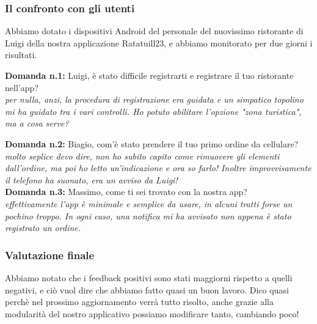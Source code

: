     \subsubsection{Il confronto con gli utenti}
        \begin{flushleft}
            Abbiamo dotato i dispositivi Android del personale del nuovissimo ristorante di Luigi della nostra applicazione Ratatuill23,
            e abbiamo monitorato per due giorni i risultati.

            \textbf{Domanda n.1:} Luigi, è stato difficile registrarti e registrare il tuo ristorante nell'app?\\
            \emph{per nulla, anzi, la procedura di registrazione era guidata e un simpatico topolino mi ha guidato tra i vari controlli. Ho potuto abilitare l'opzione "zona turistica", ma a cosa serve?}\\
            \vspace{0.2cm}

            \textbf{Domanda n.2:} Biagio, com'è stato prendere il tuo primo ordine da cellulare?\\
            \emph{molto seplice devo dire, non ho subito capito come rimuovere gli elementi dall'ordine, ma poi ho letto un'indicazione e ora so farlo! Inoltre improvvisamente il telefono ha suonato, era un avviso da Luigi!}\\
            \vspace{0.2cm}
            \newpage
            \textbf{Domanda n.3:} Massimo, come ti sei trovato con la nostra app?\\
            \emph{effettivamente l'app è minimale e semplice da usare, in alcuni tratti forse un pochino troppo. In ogni caso, una notifica mi ha avvisato non appena è stato registrato un ordine.}
        \end{flushleft}

    \subsubsection{Valutazione finale}
        \begin{flushleft}
            Abbiamo notato che i feedback positivi sono stati maggiorni rispetto a quelli negativi, e ciò vuol dire che abbiamo fatto quasi un buon lavoro. Dico quasi  perchè nel prossimo aggiornamento
            verrà tutto risolto, anche grazie alla modularità del nostro applicativo possiamo modificare tanto, cambiando poco!
        \end{flushleft}